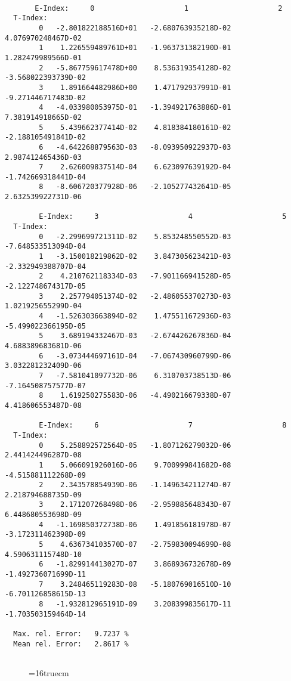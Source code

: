 \documentclass[12pt,dvipdfmx]{article}
\begin{document}
\begin{small}\begin{verbatim}

       E-Index:     0                     1                     2
  T-Index:
        0   -2.801822188516D+01   -2.680763935218D-02    4.076970248467D-02
        1    1.226559489761D+01   -1.963731382190D-01    1.282479989566D-01
        2   -5.867759617478D+00    8.536319354128D-02   -3.568022393739D-02
        3    1.891664482986D+00    1.471792937991D-01   -9.271446717483D-02
        4   -4.033980053975D-01   -1.394921763886D-01    7.381914918665D-02
        5    5.439662377414D-02    4.818384180161D-02   -2.188105491841D-02
        6   -4.642268879563D-03   -8.093950922937D-03    2.987412465436D-03
        7    2.626009837514D-04    6.623097639192D-04   -1.742669318441D-04
        8   -8.606720377928D-06   -2.105277432641D-05    2.632539922731D-06

        E-Index:     3                     4                     5
  T-Index:
        0   -2.299699721311D-02    5.853248550552D-03   -7.648533513094D-04
        1   -3.150018219862D-02    3.847305623421D-03   -2.332949388707D-04
        2    4.210762118334D-03   -7.901166941528D-05   -2.122748674317D-05
        3    2.257794051374D-02   -2.486055370273D-03    1.021925655299D-04
        4   -1.526303663894D-02    1.475511672936D-03   -5.499022366195D-05
        5    3.689194332467D-03   -2.674426267836D-04    4.688389683681D-06
        6   -3.073444697161D-04   -7.067430960799D-06    3.032281232409D-06
        7   -7.581041097732D-06    6.310703738513D-06   -7.164508757577D-07
        8    1.619250275583D-06   -4.490216679338D-07    4.418606553487D-08

        E-Index:     6                     7                     8
  T-Index:
        0    5.258892572564D-05   -1.807126279032D-06    2.441424496287D-08
        1    5.066091926016D-06    9.700999841682D-08   -4.515881112268D-09
        2    2.343578854939D-06   -1.149634211274D-07    2.218794688735D-09
        3    2.171207268498D-06   -2.959885648343D-07    6.448680553698D-09
        4   -1.169850372738D-06    1.491856181978D-07   -3.172311462398D-09
        5    4.636734103570D-07   -2.759830094699D-08    4.590631115748D-10
        6   -1.829914413027D-07    3.868936732678D-09   -1.492736071699D-11
        7    3.248465119283D-08   -5.180769016510D-10   -6.701126858615D-13
        8   -1.932812965191D-09    3.208399835617D-11   -1.703503159464D-14

  Max. rel. Error:   9.7237 %
  Mean rel. Error:   2.8617 %


\end{verbatim}\end{small}
\begin{figure} \label{2.2.h2r}
\epsfxsize=16truecm
\end{figure}
\newpage
\end{document}
